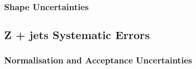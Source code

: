 
\subsubsection{Shape Uncertainties}

\subsection{Z + jets Systematic Errors}
\label{sec:zjets-systs}


\subsubsection{Normalisation and Acceptance Uncertainties}



